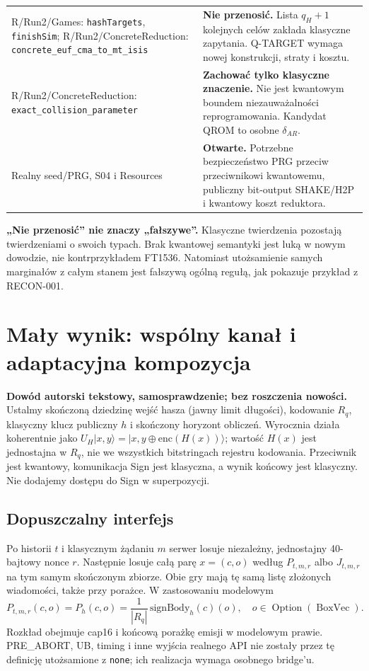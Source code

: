 \documentclass[11pt,a4paper]{article}
\newcommand{\code}[1]{\nolinkurl{#1}}
\begin{document}
\begin{longtable}{@{}p{.34\linewidth}p{.61\linewidth}@{}}
R/Run2/Games: \code{hashTargets}, \code{finishSim};
R/Run2/ConcreteReduction: \code{concrete_euf_cma_to_mt_isis}
& \textbf{Nie przenosić.} Lista $q_H+1$ kolejnych celów zakłada klasyczne
zapytania. Q-TARGET wymaga nowej konstrukcji, straty i kosztu.\\
R/Run2/ConcreteReduction: \code{exact_collision_parameter}
& \textbf{Zachować tylko klasyczne znaczenie.} Nie jest kwantowym boundem
niezauważalności reprogramowania. Kandydat QROM to osobne $\delta_{AR}$.\\
Realny seed/PRG, S04 i Resources
& \textbf{Otwarte.} Potrzebne bezpieczeństwo PRG przeciw przeciwnikowi
kwantowemu, publiczny bit-output SHAKE/H2P i kwantowy koszt reduktora.\\
\bottomrule
\end{longtable}
\normalsize

\textbf{„Nie przenosić” nie znaczy „fałszywe”.} Klasyczne twierdzenia pozostają
twierdzeniami o swoich typach. Brak kwantowej semantyki jest luką w nowym
dowodzie, nie kontrprzykładem FT1536. Natomiast utożsamienie samych marginałów
z całym stanem jest fałszywą ogólną regułą, jak pokazuje przykład z RECON-001.

\section{Mały wynik: wspólny kanał i adaptacyjna kompozycja}
\textbf{Dowód autorski tekstowy, samosprawdzenie; bez roszczenia nowości.}
Ustalmy skończoną dziedzinę wejść hasza (jawny limit długości), kodowanie
$R_q$, klasyczny klucz publiczny $h$ i skończony horyzont obliczeń.
Wyrocznia działa koherentnie jako
$U_H\lvert x,y\rangle=\lvert x,y\mathbin{\oplus}\mathrm{enc}(H(x))\rangle$;
wartość $H(x)$ jest jednostajna w $R_q$, nie we wszystkich bitstringach
rejestru kodowania. Przeciwnik jest kwantowy, komunikacja Sign jest klasyczna,
a wynik końcowy jest klasyczny. Nie dodajemy dostępu do Sign w superpozycji.

\subsection*{Dopuszczalny interfejs}
Po historii $t$ i klasycznym żądaniu $m$ serwer losuje niezależny,
jednostajny 40-bajtowy nonce $r$. Następnie losuje całą parę $x=(c,o)$
według $P_{t,m,r}$ albo $J_{t,m,r}$ na tym samym skończonym zbiorze.
Obie gry mają tę samą listę złożonych wiadomości, także przy porażce.
W zastosowaniu modelowym
\[
 P_{t,m,r}(c,o)=P_h(c,o)
   =\frac{1}{|R_q|}\,\mathrm{signBody}_h(c)(o),
 \quad o\in\operatorname{Option}(\operatorname{BoxVec}).
\]
Rozkład obejmuje cap16 i końcową porażkę emisji w modelowym prawie.
PRE\_ABORT, UB, timing i inne wyjścia realnego API nie zostały przez tę
definicję utożsamione z \code{none}; ich realizacja wymaga osobnego bridge'u.
\end{document}
